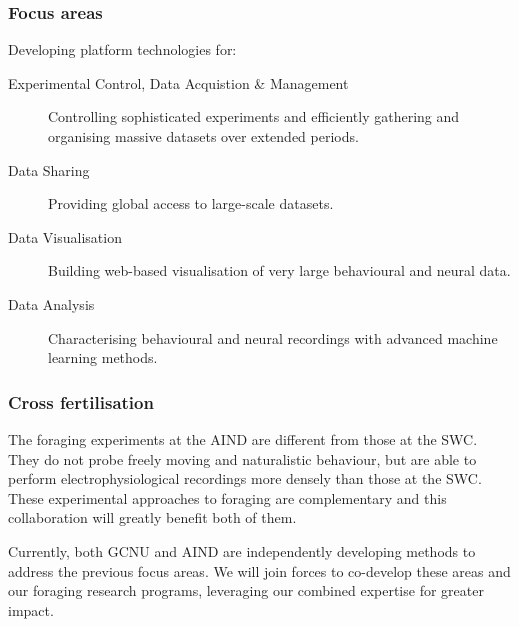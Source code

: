 \subsubsection{Focus areas}

Developing platform technologies for:

\begin{description}

    \item[Experimental Control, Data Acquistion \& Management] Controlling
        sophisticated experiments and efficiently gathering and organising
        massive datasets over extended periods.

    \item[Data Sharing] Providing global access to large-scale datasets.

    \item[Data Visualisation] Building web-based visualisation of very large
        behavioural and neural data.

    \item[Data Analysis] Characterising behavioural and neural recordings with
        advanced machine learning methods.

\end{description}

\subsubsection{Cross fertilisation}

The foraging experiments at the AIND are different from those at the SWC. They
do not probe freely moving and naturalistic behaviour, but are able to perform
electrophysiological recordings more densely than those at the SWC.
%
These experimental approaches to foraging are complementary and this
collaboration will greatly benefit both of them.

Currently, both GCNU and AIND are independently developing methods to address
the previous focus areas. We will join forces to co-develop these areas and
our foraging research programs, leveraging our combined expertise for greater
impact.
